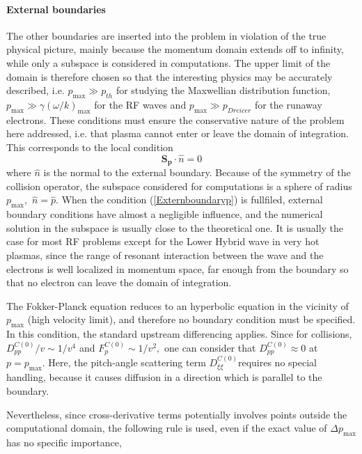 \paragraph{External boundaries}

The other boundaries are inserted into the problem in violation of the true
physical picture, mainly because the momentum domain extends off to
infinity, while only a subspace is considered in computations. The upper
limit of the domain is therefore chosen so that the interesting physics may
be accurately described, i.e. $p_{\max }\gg p_{th}$ for studying the
Maxwellian distribution function, $p_{\max }\gg \gamma \left( \omega
/k\right) _{\max }$ for the RF waves and $p_{\max }\gg p_{Dreicer}$ for the
runaway electrons. These conditions must ensure the conservative nature of
the problem here addressed, i.e. that plasma cannot enter or leave the
domain of integration. This corresponds to the local condition
\begin{equation}
\mathbf{S}_{\mathbf{p}}\cdot \widehat{n}=0  \label{Externboundaryp}
\end{equation}
where $\widehat{n}$ is the normal to the external boundary. Because of the
symmetry of the collision operator, the subspace considered for computations
is a sphere of radius $p_{\max },$ $\widehat{n}=\widehat{p}.$ When the
condition (\ref{Externboundaryp}) is fullfiled, external boundary conditions
have almost a negligible influence, and the numerical solution in the
subspace is usually close to the theoretical one. It is usually the case for
most RF problems except for the Lower Hybrid wave in very hot plasmas, since
the range of resonant interaction between the wave and the electrons is well
localized in momentum space, far enough from the boundary so that no
electron can leave the domain of integration.

The Fokker-Planck equation reduces to an hyperbolic equation in the vicinity
of $p_{\max }$ (high velocity limit), and therefore no boundary condition
must be specified. In this condition, the standard upstream differencing
applies. Since for collisions, $D_{pp}^{C\left( 0\right) }/v\sim 1/v^{4}$
and $F_{p}^{C\left( 0\right) }\sim 1/v^{2},$ one can consider that $%
D_{pp}^{C\left( 0\right) }\approx 0$ at $p=p_{\max }.$ Here, the pitch-angle
scattering term $D_{\xi \xi }^{C\left( 0\right) }$requires no special
handling, because it causes diffusion in a direction which is parallel to
the boundary.

Nevertheless, since cross-derivative terms potentially involves points
outside the computational domain, the following rule is used, even if the
exact value of $\Delta p_{\max }$ has no specific importance,

